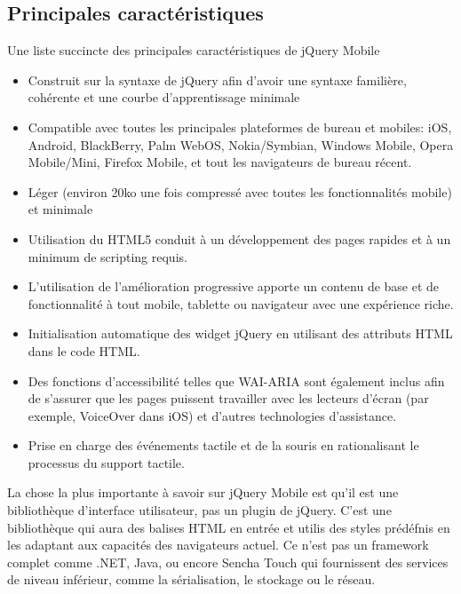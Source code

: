 \subsection{Principales caractéristiques}

Une liste succincte des principales caractéristiques de jQuery Mobile

\begin{itemize}
  \item[\textbullet]
  Construit sur la syntaxe de jQuery afin d’avoir une syntaxe familière, cohérente et une courbe d’apprentissage minimale
  
  \item[\textbullet]
  Compatible avec toutes les principales plateformes de bureau et mobiles: iOS, Android, BlackBerry, Palm WebOS, Nokia/Symbian, Windows Mobile, Opera Mobile/Mini, Firefox Mobile, et tout les navigateurs de bureau récent.
  
  \item[\textbullet]
  Léger (environ 20ko une fois compressé avec toutes les fonctionnalités mobile) et minimale
  
  \item[\textbullet]
  Utilisation du HTML5 conduit à un développement des pages rapides et à un minimum de scripting requis.
  
  \item[\textbullet]
  L’utilisation de l’amélioration progressive apporte un contenu de base et de fonctionnalité à tout mobile, tablette ou navigateur avec une expérience riche.
  
  \item[\textbullet]
  Initialisation automatique des widget jQuery en utilisant des attributs HTML dans le code HTML.
  
  \item[\textbullet]
  Des fonctions d'accessibilité telles que WAI-ARIA sont également inclus afin de s’assurer que les pages puissent travailler avec les lecteurs d’écran (par exemple, VoiceOver dans iOS) et d’autres technologies d’assistance.
  
  \item[\textbullet]
  Prise en charge des événements tactile et de la souris en rationalisant le processus du support tactile.
  
\end{itemize}


La chose la plus importante à savoir sur jQuery Mobile est qu’il est une bibliothèque d’interface utilisateur, pas un plugin de jQuery. C’est une bibliothèque qui aura des balises HTML en entrée et utilis des styles prédéfnis en les adaptant aux capacités des navigateurs actuel. Ce n’est pas un framework complet comme .NET, Java, ou encore Sencha Touch qui fournissent des services de niveau inférieur, comme la sérialisation, le stockage ou le réseau.


